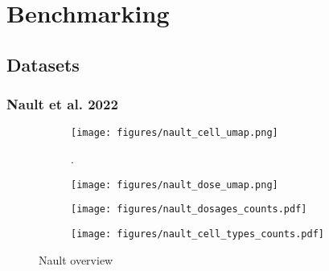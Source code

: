\chapter{Benchmarking}
\label{ch:chapter1}

\clearpage


\section{Datasets}

\subsection{Nault et al. 2022}

\begin{figure}[h]
    \centering
    \begin{subfigure}[t]{0.49\textwidth}
        \centering
        \texttt{[image: figures/nault\_cell\_umap.png]}
        \caption{}
        \label{fig:figure1}.
    \end{subfigure}%
    \hfill
    \begin{subfigure}[t]{0.49\textwidth}
        \centering
        \texttt{[image: figures/nault\_dose\_umap.png]}
        \caption{}
        \label{fig:figure2}
    \end{subfigure}%
    \hfill
    \begin{subfigure}[b]{\textwidth}
        \centering
        \texttt{[image: figures/nault\_dosages\_counts.pdf]}
        \caption{}
        \label{fig:figure3}
    \end{subfigure}
    \hfill
    \begin{subfigure}[b]{\textwidth}
        \centering
        \texttt{[image: figures/nault\_cell\_types\_counts.pdf]}
        \caption{}
        \label{fig:figure4}
    \end{subfigure}    
    \caption{Nault overview}
    \label{fig:combined}
\end{figure}



